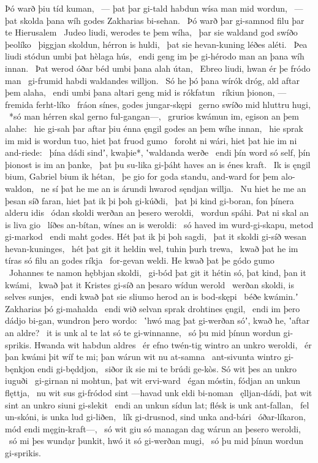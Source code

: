 Þó warð þiu tíd kuman, \hld\ — þat þar gi-tald habdun
wísa man mid wordun, \hld\ — þat skolda þana wíh godes
Zakharias bi-sehan. \hld\ Þó warð þar gi-samnod filu
þar te Hierusalem \hld\ Judeo liudi,
werodes te þem wíha, \hld\ þar sie waldand god
swíðo þeolíko \hld\ þiggjan skoldun,
hérron is huldi, \hld\ þat sie hevan-kuning
léðes aléti. \hld\ Þea liudi stódun
umbi þat hèlaga hús, \hld\ endi geng im þe gi-hérodo man
an þana wíh innan. \hld\ Þat werod óðar béd
umbi þana alah útan, \hld\ Ebreo liudi,
hwan ér þe fródo man \hld\ gi-frumid habdi
waldandes willjon. \hld\ Só he þó þana wírók dróg,
ald aftar þem alaha, \hld\ endi umbi þana altari geng
mid is rókfatun \hld\ ríkiun þionon,
—fremida ferht-líko \hld\ fráon sínes,
godes jungar-skępi \hld\ gerno swíðo
mid hluttru hugi, \hld\ *só man hérren skal
gerno ful-gangan—, \hld\ grurios kwámun im,
egison an þem alahe: \hld\ hie gi-sah þar aftar þiu énna ęngil godes
an þem wíhe innan, \hld\ hie sprak im mid is wordun tuo,
hiet þat fruod gumo \hld\ foroht ni wári,
hiet þat hie im ni and-riede: \hld\ þína dádi sindʼ, kwaþie*,
ʽwaldanda werðe \hld\ endi þín word só self,
þín þionost is im an þanke, \hld\ þat þu su-lika gi-þáht haves
an is énes kraft. \hld\ Ik is ęngil bium,
Gabriel bium ik hétan, \hld\ þe gio for goda standu,
and-ward for þem alo-waldon, \hld\ ne sí þat he me an is árundi hwarod
sęndjan willja. \hld\ Nu hiet he me an þesan síð faran,
hiet þat ik þi þoh gi-kúðdi, \hld\ þat þi kind gi-boran,
fon þínera alderu idis \hld\ ódan skoldi
werðan an þesero weroldi, \hld\ wordun spáhi.
Þat ni skal an is liva gio \hld\ líðes an-bítan,
wínes an is weroldi: \hld\ só haved im wurd-gi-skapu,
metod gi-markod \hld\ endi maht godes.
Hét þat ik þi þoh sagdi, \hld\ þat it skoldi gi-síð wesan
hevan-kuninges, \hld\ hét þat git it heldin wel,
tuhin þurh trewa, \hld\ kwað þat he im tíras só filu
an godes ríkja \hld\ for-gevan weldi.
He kwað þat þe gódo gumo \hld\ Johannes te namon
hębbjan skoldi, \hld\ gi-bód þat git it hétin só,
þat kind, þan it kwámi, \hld\ kwað þat it Kristes gi-síð
an þesaro wídun werold \hld\ werðan skoldi,
is selves sunjes, \hld\ endi kwað þat sie sliumo herod
an is bod-skępi \hld\ béðe kwámin.ʼ
Zakharias þó gi-mahalda \hld\ endi wið selvan sprak
drohtines ęngil, \hld\ endi im þero dádjo bi-gan,
wundron þero wordo: \hld\ ʽhwó mag þat gi-werðan sóʼ, kwað he,
ʽaftar an aldre? \hld\ it is unk al te lat
só te gi-winnanne, \hld\ só þu mid þínun wordun gi-sprikis.
Hwanda wit habdun aldres \hld\ ér efno twén-tig
wintro an unkro weroldi, \hld\ ér þan kwámi þit wíf te mi;
þan wárun wit nu at-samna \hld\ ant-sivunta wintro
gi-bęnkjon endi gi-będdjon, \hld\ siðor ik sie mi te brúdi ge-kòs.
Só wit þes an unkro iuguði \hld\ gi-girnan ni mohtun,
þat wit ervi-ward \hld\ égan móstin,
fódjan an unkun flęttja, \hld\ nu wit sus gi-fródod sint
—havad unk eldi bi-noman \hld\ ęlljan-dádi,
þat wit sint an unkro siuni gi-slekit \hld\ endi an unkun sídun lat;
flésk is unk ant-fallan, \hld\ fel un-skóni,
is unka lud gi-liðen, \hld\ lík gi-drusnod,
sind unka and-bári \hld\ óðar-líkaron,
mód endi męgin-kraft—, \hld\ só wit giu só managan dag
wárun an þesero weroldi, \hld\ só mi þes wundạr þunkit,
hwó it só gi-werðan mugi, \hld\ só þu mid þínun wordun gi-sprikis.


